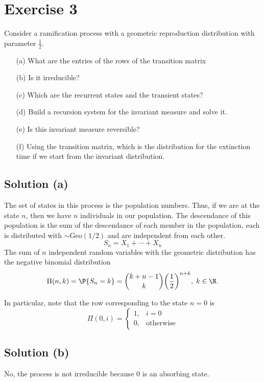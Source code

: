 \section*{Exercise 3}

Consider a ramification process with a geometric reproduction distribution with parameter $\frac{1}{2}$.

\begin{itemize}
    \item[(a)] What are the entries of the rows of the transition matrix
    \item[(b)] Is it irreducible?
    \item[(c)] Which are the recurrent states and the transient states?
    \item[(d)] Build a recursion system for the invariant measure and solve it.
    \item[(e)] Is this invariant measure reversible?
    \item[(f)] Using the transition matrix, which is the distribution for the extinction time if we start from the invariant distribution.  
\end{itemize}

\subsection*{Solution (a)}

The set of states in this process is the population numbers. Thus, if we are at the state $n$, then we have $n$ individuals in our population. The descendance of this population is the sum of the descendance of each member in the population, each is distributed with $\sim\text{Geo}(1/2)$ and are independent from each other.
\[ S_n = X_1+\cdots+X_n \]
The sum of $n$ independent random variables with the geometric distribution has the negative binomial distribution
\[ \Pi(n,k) = \P\{S_n = k\} = \binom{k+n-1}{k}{\left( \frac{1}{2} \right)}^{n+k},\; k \in \N. \]

In particular, note that the row corresponding to the state $n=0$ is
\[ \Pi(0,i) = \begin{cases}
    1,& i = 0\\
    0, & \mbox{otherwise}
\end{cases} \]

\subsection*{Solution (b)}

No, the process is not irreducible because 0 is an absorbing state.

